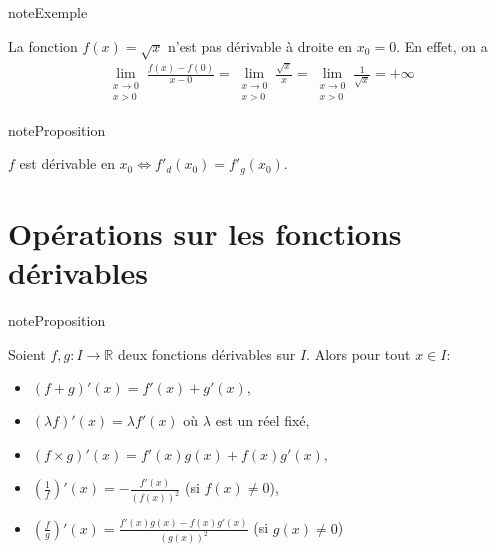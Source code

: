 \documentclass[letterpaper,10pt,french]{jupyterBook}
\begin{document}
\begin{sphinxadmonition}{note}{Exemple}

\sphinxAtStartPar
La fonction \(f(x)=\sqrt{x}\) n’est pas dérivable à droite en \(x_0=0.\) En effet, on a
\begin{equation*}
\begin{split}
\lim\limits_{\substack{x \rightarrow 0 \\ x>0}}\frac{f(x)-f(0)}{x-0}=\lim\limits_{\substack{x \rightarrow 0 \\ x>0}}\frac{\sqrt{x}}{x}=\lim\limits_{\substack{x \rightarrow 0 \\ x>0}}\frac{1}{\sqrt{x}}=+\infty
\end{split}
\end{equation*}\end{sphinxadmonition}

\begin{sphinxadmonition}{note}{Proposition}

\sphinxAtStartPar
\(f\) est dérivable en \(x_0\Leftrightarrow f'_d(x_0)=f'_g(x_0).\)
\end{sphinxadmonition}


\section{Opérations sur les fonctions dérivables}
\label{\detokenize{dirivfs:operations-sur-les-fonctions-derivables}}
\begin{sphinxadmonition}{note}{Proposition}

\sphinxAtStartPar
Soient \(f,g:I\rightarrow \mathbb{R}\) deux fonctions dérivables sur \(I.\) Alors pour tout \(x\in I:\)
\begin{itemize}
\item {} 
\sphinxAtStartPar
\((f+g)'(x)=f'(x)+g'(x),\)

\item {} 
\sphinxAtStartPar
\((\lambda f)'(x)=\lambda f'(x)\) où \(\lambda\) est un réel fixé,

\item {} 
\sphinxAtStartPar
\((f\times g)'(x)=f'(x)g(x)+f(x)g'(x),\)

\item {} 
\sphinxAtStartPar
\((\frac{1}{f})'(x)=-\frac{f'(x)}{(f(x))^2}\) (si \(f(x)\neq0\)),

\item {} 
\sphinxAtStartPar
\((\frac{f}{g})'(x)=\frac{f'(x)g(x)-f(x)g'(x)}{(g(x))^2}\) (si \(g(x)\neq 0\))

\end{itemize}
\end{sphinxadmonition}
\end{document}
